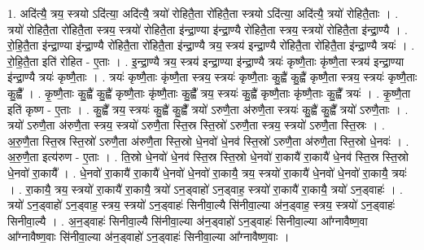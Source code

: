\documentclass[17pt]{extarticle}
\begin{document}
1. अदि॑त्यै॒ त्रय॒ स्त्रयो ऽदि॑त्या॒ अदि॑त्यै॒ त्रयो॑ रोहितै॒ता रो॑हितै॒ता स्त्रयो ऽदि॑त्या॒ अदि॑त्यै॒ त्रयो॑ रोहितै॒ताः । . त्रयो॑ रोहितै॒ता रो॑हितै॒ता स्त्रय॒ स्त्रयो॑ रोहितै॒ता इ॑न्द्रा॒ण्या इ॑न्द्रा॒ण्यै रो॑हितै॒ता स्त्रय॒ स्त्रयो॑ रोहितै॒ता इ॑न्द्रा॒ण्यै । . रो॒हि॒तै॒ता इ॑न्द्रा॒ण्या इ॑न्द्रा॒ण्यै रो॑हितै॒ता रो॑हितै॒ता इ॑न्द्रा॒ण्यै त्रय॒ स्त्रय॑ इन्द्रा॒ण्यै रो॑हितै॒ता रो॑हितै॒ता इ॑न्द्रा॒ण्यै त्रयः॑ । . रो॒हि॒तै॒ता इति॑ रोहित - ए॒ताः । . इ॒न्द्रा॒ण्यै त्रय॒ स्त्रय॑ इन्द्रा॒ण्या इ॑न्द्रा॒ण्यै त्रयः॑ कृष्णै॒ताः कृ॑ष्णै॒ता स्त्रय॑ इन्द्रा॒ण्या इ॑न्द्रा॒ण्यै त्रयः॑ कृष्णै॒ताः । . त्रयः॑ कृष्णै॒ताः कृ॑ष्णै॒ता स्त्रय॒ स्त्रयः॑ कृष्णै॒ताः कु॒ह्वै॑ कु॒ह्वै॑ कृष्णै॒ता स्त्रय॒ स्त्रयः॑ कृष्णै॒ताः कु॒ह्वै᳚ । . कृ॒ष्णै॒ताः कु॒ह्वै॑ कु॒ह्वै॑ कृष्णै॒ताः कृ॑ष्णै॒ताः कु॒ह्वै᳚ त्रय॒ स्त्रयः॑ कु॒ह्वै॑ कृष्णै॒ताः कृ॑ष्णै॒ताः कु॒ह्वै᳚ त्रयः॑ । . कृ॒ष्णै॒ता इति॑ कृष्ण - ए॒ताः । . कु॒ह्वै᳚ त्रय॒ स्त्रयः॑ कु॒ह्वै॑ कु॒ह्वै᳚ त्रयो॑ ऽरुणै॒ता अ॑रुणै॒ता स्त्रयः॑ कु॒ह्वै॑ कु॒ह्वै᳚ त्रयो॑ ऽरुणै॒ताः । . त्रयो॑ ऽरुणै॒ता अ॑रुणै॒ता स्त्रय॒ स्त्रयो॑ ऽरुणै॒ता स्ति॒स्र स्ति॒स्रो॑ ऽरुणै॒ता स्त्रय॒ स्त्रयो॑ ऽरुणै॒ता स्ति॒स्रः । . अ॒रु॒णै॒ता स्ति॒स्र स्ति॒स्रो॑ ऽरुणै॒ता अ॑रुणै॒ता स्ति॒स्रो धे॒नवो॑ धे॒नव॑ स्ति॒स्रो॑ ऽरुणै॒ता अ॑रुणै॒ता स्ति॒स्रो धे॒नवः॑ । . अ॒रु॒णै॒ता इत्य॑रुण - ए॒ताः । . ति॒स्रो धे॒नवो॑ धे॒नव॑ स्ति॒स्र स्ति॒स्रो धे॒नवो॑ रा॒कायै॑ रा॒कायै॑ धे॒नव॑ स्ति॒स्र स्ति॒स्रो धे॒नवो॑ रा॒कायै᳚ । . धे॒नवो॑ रा॒कायै॑ रा॒कायै॑ धे॒नवो॑ धे॒नवो॑ रा॒कायै॒ त्रय॒ स्त्रयो॑ रा॒कायै॑ धे॒नवो॑ धे॒नवो॑ रा॒कायै॒ त्रयः॑ । . रा॒कायै॒ त्रय॒ स्त्रयो॑ रा॒कायै॑ रा॒कायै॒ त्रयो॑ ऽन॒ड्वाहो॑ ऽन॒ड्वाह॒ स्त्रयो॑ रा॒कायै॑ रा॒कायै॒ त्रयो॑ ऽन॒ड्वाहः॑ । . त्रयो॑ ऽन॒ड्वाहो॑ ऽन॒ड्वाह॒ स्त्रय॒ स्त्रयो॑ ऽन॒ड्वाहः॑ सिनीवा॒ल्यै सि॑नीवा॒ल्या अ॑न॒ड्वाह॒ स्त्रय॒ स्त्रयो॑ ऽन॒ड्वाहः॑ सिनीवा॒ल्यै । . अ॒न॒ड्वाहः॑ सिनीवा॒ल्यै सि॑नीवा॒ल्या अ॑न॒ड्वाहो॑ ऽन॒ड्वाहः॑ सिनीवा॒ल्या आ᳚ग्नावैष्ण॒वा आ᳚ग्नावैष्ण॒वाः सि॑नीवा॒ल्या अ॑न॒ड्वाहो॑ ऽन॒ड्वाहः॑ सिनीवा॒ल्या आ᳚ग्नावैष्ण॒वाः । \newline
\end{document}
